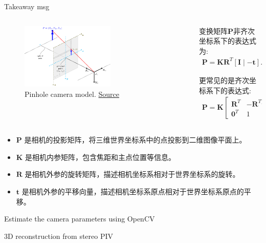 \documentclass[10pt,xcolor={table,dvipsnames},t]{beamer}
\begin{document}
\begin{frame}{Takeaway msg}
  \begin{columns}
    \begin{column}{0.6\textwidth}
      \begin{figure}
        \centering
        \includegraphics[width=0.6\textwidth]{figures/cv-pinhole-camera-model.png}
        \caption{Pinhole camera model. \href{https://docs.opencv.org/4.x/d9/d0c/group\_\_calib3d.html}{Source}}
      \end{figure}
    \end{column}
    
    \begin{column}{0.4\textwidth}
      变换矩阵$\mathbf{P}$非齐次坐标系下的表达式为:
      \begin{align*}
        \mathbf{P} = \mathbf{K} \mathbf{R}^T [\mathbf{I} \mid -\mathbf{t}].
      \end{align*}
      
      更常见的是齐次坐标系下的表达式:
      \begin{align*}
        \mathbf{P} = \mathbf{K} \begin{bmatrix}
        \mathbf{R}^T & -\mathbf{R}^T\mathbf{t} \\
        \mathbf{0}^T & 1
        \end{bmatrix}.
      \end{align*}
    \end{column}
  \end{columns}
  \begin{itemize}
    \item $\mathbf{P}$ 是相机的投影矩阵，将三维世界坐标系中的点投影到二维图像平面上。
    \item $\mathbf{K}$ 是相机内参矩阵，包含焦距和主点位置等信息。
    \item $\mathbf{R}$ 是相机外参的旋转矩阵，描述相机坐标系相对于世界坐标系的旋转。
    \item $\mathbf{t}$ 是相机外参的平移向量，描述相机坐标系原点相对于世界坐标系原点的平移。
  \end{itemize}
\end{frame}

\begin{frame}{Estimate the camera parameters using OpenCV}
\end{frame}

\begin{frame}{3D reconstruction from stereo PIV}
\end{frame}
\end{document}
